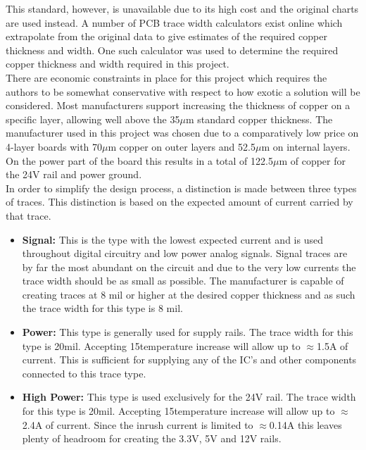 This standard, however, is unavailable due to its high cost and the original charts are used instead.
A number of PCB trace width calculators exist online which extrapolate from the original data to give estimates of the required copper thickness and width.
One such calculator \cite{pcb_trace_calc} was used to determine the required copper thickness and width required in this project.
~\\
There are economic constraints in place for this project which requires the authors to be somewhat conservative with respect to how exotic a solution will be considered.
Most manufacturers support increasing the thickness of copper on a specific layer, allowing well above the 35$\mu$m standard copper thickness.
The manufacturer used in this project was chosen due to a comparatively low price on 4-layer boards with 70$\mu$m copper on outer layers and 52.5$\mu$m on internal layers.
On the power part of the board this results in a total of 122.5$\mu$m of copper for the 24V rail and power ground.
~\\
In order to simplify the design process, a distinction is made between three types of traces.
This distinction is based on the expected amount of current carried by that trace.
\begin{itemize}
	\item \textbf{Signal:} This is the type with the lowest expected current and is used throughout digital circuitry and low power analog signals.
	Signal traces are by far the most abundant on the circuit and due to the very low currents the trace width should be as small as possible.
	The manufacturer is capable of creating traces at 8 mil or higher at the desired copper thickness and as such the trace width for this type is 8 mil.
	\item \textbf{Power:} This type is generally used for supply rails.
	The trace width for this type is 20mil. Accepting 15\degree temperature increase will allow up to $\approx$1.5A of current.
	This is sufficient for supplying any of the IC's and other components connected to this trace type.
	\item \textbf{High Power:} This type is used exclusively for the 24V rail.
	The trace width for this type is 20mil. Accepting 15\degree temperature increase will allow up to $\approx$2.4A of current.
	Since the inrush current is limited to $\approx$0.14A this leaves plenty of headroom for creating the 3.3V, 5V and 12V rails.
\end{itemize}

